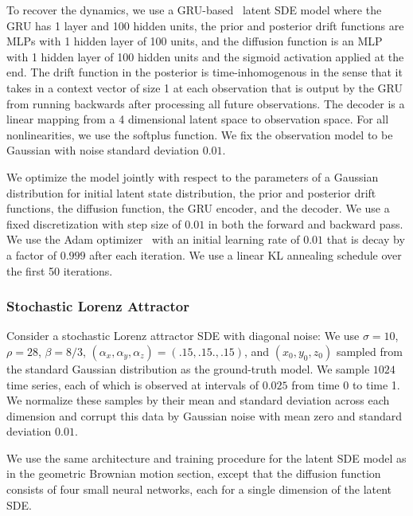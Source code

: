 \documentclass[twoside]{article}
\begin{document}
To recover the dynamics, we use a GRU-based~\cite{cho2014learning} latent SDE model where the GRU has 1 layer and 100 hidden units, the prior and posterior drift functions are MLPs with 1 hidden layer of 100 units, and the diffusion function is an MLP with 1 hidden layer of 100 hidden units and the sigmoid activation applied at the end. 
The drift function in the posterior is time-inhomogenous in the sense that it takes in a context vector of size 1 at each observation that is output by the GRU from running backwards after processing all future observations.
The decoder is a linear mapping from a 4 dimensional latent space to observation space. 
For all nonlinearities, we use the softplus function.
We fix the observation model to be Gaussian with noise standard deviation $0.01$.

We optimize the model jointly with respect to the parameters of a Gaussian distribution for initial latent state distribution, the prior and posterior drift functions, the diffusion function, the GRU encoder, and the decoder. 
We use a fixed discretization with step size of $0.01$ in both the forward and backward pass.
We use the Adam optimizer~\cite{kingma2014adam} with an initial learning rate of $0.01$ that is decay by a factor of $0.999$ after each iteration.
We use a linear KL annealing schedule over the first 50 iterations. 

\subsubsection{Stochastic Lorenz Attractor}
Consider a stochastic Lorenz attractor SDE with diagonal noise:
We use $\sigma=10$, $\rho=28$, $\beta=8/3$, $(\alpha_x, \alpha_y, \alpha_z) = (.15, .15., .15)$, and $(x_0, y_0, z_0)$ sampled from the standard Gaussian distribution as the ground-truth model. We sample $1024$ time series, each of which is observed at intervals of $0.025$ from time 0 to time 1. We normalize these samples by their mean and standard deviation across each dimension and corrupt this data by Gaussian noise with mean zero and standard deviation $0.01$.

We use the same architecture and training procedure for the latent SDE model as in the geometric Brownian motion section, except that the diffusion function consists of four small neural networks, each for a single dimension of the latent SDE.
\end{document}
